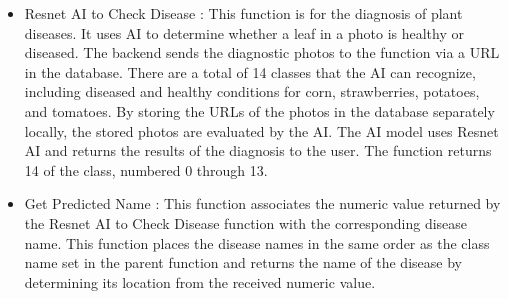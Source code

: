 \documentclass[conference, a4paper]{IEEEtran}
\begin{document}
\begin{enumerate}
\begin{itemize}
\begin{itemize}
\begin{itemize}
            \item Resnet AI to Check Disease : This function is for the diagnosis of plant diseases. It uses AI to determine whether a leaf in a photo is healthy or diseased. The backend sends the diagnostic photos to the function via a URL in the database. There are a total of 14 classes that the AI can recognize, including diseased and healthy conditions for corn, strawberries, potatoes, and tomatoes. By storing the URLs of the photos in the database separately locally, the stored photos are evaluated by the AI. The AI model uses Resnet AI and returns the results of the diagnosis to the user. The function returns 14 of the class, numbered 0 through 13. \\
            \item Get Predicted Name : This function associates the numeric value returned by the Resnet AI to Check Disease function with the corresponding disease name. This function places the disease names in the same order as the class name set in the parent function and returns the name of the disease by determining its location from the received numeric value.
        \end{itemize}


\end{itemize}
\end{itemize}
\end{enumerate}
\end{document}
